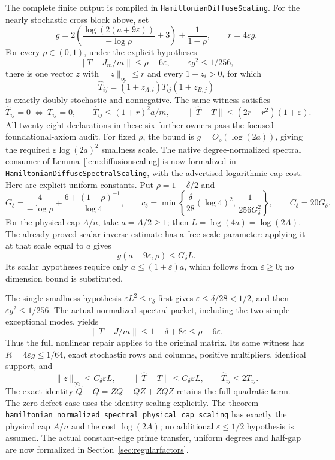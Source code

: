 The complete finite output is compiled in
\texttt{HamiltonianDiffuseScaling}. For the nearly stochastic
cross block above, set
\[
 g=2\left(\frac{\log(2(a+9\varepsilon))}{-\log\rho}+3\right)
                       +\frac1{1-\rho},\qquad
 r=4\varepsilon g .
\]
For every \(\rho\in(0,1)\), under the explicit hypotheses
\[
 \|T-J_m/m\|\leq\rho-6\varepsilon,\qquad
                    \varepsilon g^2\leq1/256,
\]
there is one vector \(z\) with \(\|z\|_\infty\leq r\)
and every \(1+z_i>0\), for which
\[
 \widehat T_{ij}=(1+z_{A,i})T_{ij}(1+z_{B,j})
\]
is exactly doubly stochastic and nonnegative. The same witness satisfies
\[
 \widehat T_{ij}=0\ \Longleftrightarrow\ T_{ij}=0,\qquad
 \widehat T_{ij}\leq(1+r)^2a/m,\qquad
 \|\widehat T-T\|\leq(2r+r^2)(1+\varepsilon).
\]
All twenty-eight declarations in these six further owners pass
the focused foundational-axiom audit.
For fixed \(\rho\), the bound is
\(g=O_\rho(\log(2a))\), giving the required
\(\varepsilon\log(2a)^2\) smallness scale.
The native degree-normalized spectral consumer of
Lemma~\ref{lem:diffusionscaling} is now formalized in
\texttt{HamiltonianDiffuseSpectralScaling}, with the advertised
logarithmic cap cost. Here are explicit uniform constants.
Put \(\rho=1-\delta/2\) and
\[
 G_\delta=\frac4{-\log\rho}
           +\frac{6+(1-\rho)^{-1}}{\log4},\qquad
 c_\delta=\min\left\{\frac{\delta}{28}(\log4)^2,\,
                    \frac1{256G_\delta^2}\right\},
 \qquad C_\delta=20G_\delta.
\]
For the physical cap \(A/n\), take \(a=A/2\geq1\);
then \(L=\log(4a)=\log(2A)\).
The already proved scalar inverse estimate has a free scale
parameter: applying it at that scale equal to \(a\) gives
\[
 g(a+9\varepsilon,\rho)\leq G_\delta L .
\]
Its scalar hypotheses require only
\(a\leq(1+\varepsilon)a\), which follows from
\(\varepsilon\geq0\); no dimension bound is substituted.

The single smallness hypothesis
\(\varepsilon L^2\leq c_\delta\) first gives
\(\varepsilon\leq\delta/28<1/2\), and then
\(\varepsilon g^2\leq1/256\).
The actual normalized spectral packet, including the two simple
exceptional modes, yields
\[
 \|T-J/m\|\leq1-\delta+8\varepsilon
             \leq\rho-6\varepsilon.
\]
Thus the full nonlinear repair applies to the original matrix.
Its same witness has \(R=4\varepsilon g\leq1/64\), exact
stochastic rows and columns, positive multipliers, identical
support, and
\[
 \|z\|_\infty\leq C_\delta\varepsilon L,\qquad
 \|\widehat T-T\|\leq C_\delta\varepsilon L,\qquad
 \widehat T_{ij}\leq2T_{ij}.
\]
The exact identity
\(\widehat Q-Q=ZQ+QZ+ZQZ\) retains the full quadratic term.
The zero-defect case uses the identity scaling explicitly.
The theorem
\texttt{hamiltonian\_normalized\_spectral\_physical\_cap\_scaling}
has exactly the physical cap \(A/n\) and the cost \(\log(2A)\);
no additional \(\varepsilon\leq1/2\) hypothesis is assumed.
The actual constant-edge prime transfer, uniform degrees and
half-gap are now formalized in Section~\ref{sec:regularfactors}.
